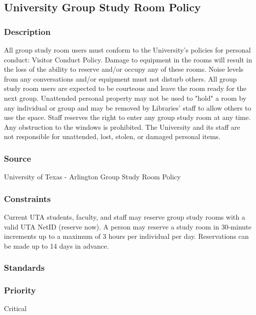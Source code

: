 \subsection{University Group Study Room Policy}
\subsubsection{Description}
All group study room users must conform to the University's policies for personal conduct: Visitor Conduct Policy. Damage to equipment in the rooms will result in the loss of the ability to reserve and/or occupy any of these rooms. Noise levels from any conversations and/or equipment must not disturb others. All group study room users are expected to be courteous and leave the room ready for the next group. Unattended personal property may not be used to "hold" a room by any individual or group and may be removed by Libraries' staff to allow others to use the space. Staff reserves the right to enter any group study room at any time. Any obstruction to the windows is prohibited. The University and its staff are not responsible for unattended, lost, stolen, or damaged personal items.
\subsubsection{Source}
University of Texas - Arlington Group Study Room Policy
\subsubsection{Constraints}
Current UTA students, faculty, and staff may reserve group study rooms with a valid UTA NetID (reserve now). A person may reserve a study room in 30-minute increments up to a maximum of 3 hours per individual per day. Reservations can be made up to 14 days in advance.
\subsubsection{Standards}

\subsubsection{Priority}
Critical
